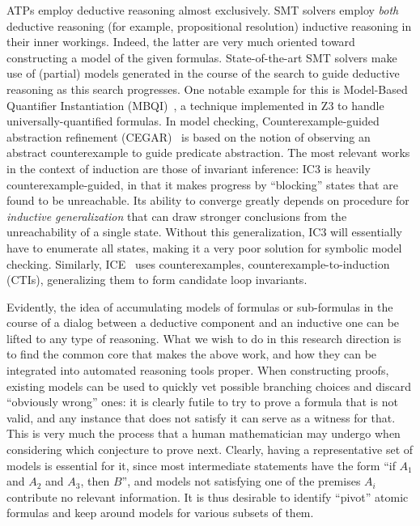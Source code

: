 ATPs employ deductive reasoning almost exclusively.
SMT solvers employ \emph{both} deductive reasoning (for example, propositional resolution) inductive reasoning in their inner workings.
Indeed, the latter are very much oriented toward constructing a model of the given formulas.
State-of-the-art SMT solvers make use of (partial) models generated in the
course of the search to guide deductive reasoning as this search progresses.
One notable example for this is Model-Based Quantifier Instantiation (MBQI)~\cite{MBQI},
a technique implemented in Z3 to handle universally-quantified formulas.
In model checking, Counterexample-guided abstraction refinement (CEGAR)~\cite{cegar} is based on the notion of observing an abstract counterexample to guide predicate abstraction.
The most relevant works in the context of induction are those of invariant inference:
IC3 is heavily counterexample-guided, in that it makes progress by ``blocking'' states that are found to be unreachable.
Its ability to converge greatly depends on procedure for \emph{inductive generalization} that can draw stronger conclusions from the unreachability of a single state.
Without this generalization, IC3 will essentially have to enumerate all states, making it a very poor solution for symbolic model checking.
Similarly, ICE~\cite{CAV2014:Pranav} uses counterexamples, \esp counterexample-to-induction (CTIs), generalizing them to form candidate loop invariants.

Evidently, the idea of accumulating models of formulas or sub-formulas in the course of
a dialog between a deductive component and an inductive one can be lifted to
any type of reasoning.
What we wish to do in this research direction is to find the common core that makes the above work,
and how they can be integrated into automated reasoning tools proper.
When constructing proofs, existing models can be used to quickly vet possible
branching choices and discard ``obviously wrong'' ones: it is clearly futile
to try to prove a formula that is not valid, and any instance that does not
satisfy it can serve as a witness for that.
This is very much the process that a human mathematician may undergo when
considering which conjecture to prove next.
Clearly, having a representative set of models is essential for it, since
most intermediate statements have the form ``if $A_1$ and $A_2$ and $A_3$, then
$B$'', and models not satisfying one of the premises $A_i$ contribute no
relevant information.
It is thus desirable to identify ``pivot'' atomic formulas and keep around
models for various subsets of them.